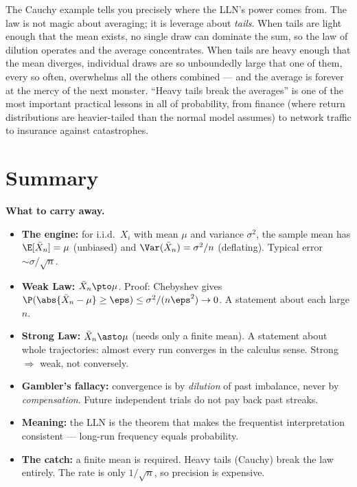 \begin{happeningbox}
The Cauchy example tells you precisely where the LLN's power comes from. The law is not magic about averaging; it is leverage about \emph{tails}. When tails are light enough that the mean exists, no single draw can dominate the sum, so the law of dilution operates and the average concentrates. When tails are heavy enough that the mean diverges, individual draws are so unboundedly large that one of them, every so often, overwhelms all the others combined --- and the average is forever at the mercy of the next monster. ``Heavy tails break the averages'' is one of the most important practical lessons in all of probability, from finance (where return distributions are heavier-tailed than the normal model assumes) to network traffic to insurance against catastrophes.
\end{happeningbox}

\section{Summary}
\label{ch20:summary}

\begin{focusbox}
\textbf{What to carry away.}
\begin{itemize}
  \item \textbf{The engine:} for i.i.d.\ $X_i$ with mean $\mu$ and variance $\sigma^2$, the sample mean has $\E[\bar X_n]=\mu$ (unbiased) and $\Var(\bar X_n)=\sigma^2/n$ (deflating). Typical error $\sim \sigma/\sqrt n$.
  \item \textbf{Weak Law:} $\bar X_n \pto \mu$. Proof: Chebyshev gives $\P(\abs{\bar X_n-\mu}\ge\eps)\le \sigma^2/(n\eps^2)\to 0$. A statement about each large $n$.
  \item \textbf{Strong Law:} $\bar X_n \asto \mu$ (needs only a finite mean). A statement about whole trajectories: almost every run converges in the calculus sense. Strong $\Rightarrow$ weak, not conversely.
  \item \textbf{Gambler's fallacy:} convergence is by \emph{dilution} of past imbalance, never by \emph{compensation}. Future independent trials do not pay back past streaks.
  \item \textbf{Meaning:} the LLN is the theorem that makes the frequentist interpretation consistent --- long-run frequency equals probability.
  \item \textbf{The catch:} a finite mean is required. Heavy tails (Cauchy) break the law entirely. The rate is only $1/\sqrt n$, so precision is expensive.
\end{itemize}
\end{focusbox}

